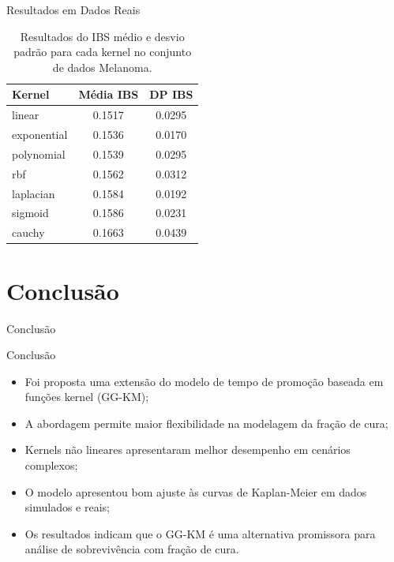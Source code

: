 \documentclass[aspectratio=169,t,xcolor=table]{beamer}
\begin{document}
\begin{frame}{Resultados em Dados Reais}
\begin{table}[ht]
\centering
\caption{Resultados do IBS médio e desvio padrão para cada kernel no conjunto de dados Melanoma.}
\label{tab:melanoma_kernels}
\begin{tabular}{lcc}
\toprule
Kernel & Média IBS & DP IBS \\
\midrule
linear      & 0.1517 & 0.0295 \\
exponential & 0.1536 & 0.0170 \\
polynomial  & 0.1539 & 0.0295 \\
rbf         & 0.1562 & 0.0312 \\
laplacian   & 0.1584 & 0.0192 \\
sigmoid     & 0.1586 & 0.0231 \\
cauchy      & 0.1663 & 0.0439 \\
\bottomrule
\end{tabular}
\end{table}
\end{frame}

\section{Conclusão}
\begin{frame}{Conclusão}
\end{frame}

\begin{frame}{Conclusão}
\begin{itemize}
\item Foi proposta uma extensão do modelo de tempo de promoção baseada em funções kernel (GG-KM);
\vspace{0.3cm}
\item A abordagem permite maior flexibilidade na modelagem da fração de cura;
\vspace{0.3cm}
\item Kernels não lineares apresentaram melhor desempenho em cenários complexos;
\vspace{0.3cm}
\item O modelo apresentou bom ajuste às curvas de Kaplan-Meier em dados simulados e reais;
\vspace{0.3cm}
\item Os resultados indicam que o GG-KM é uma alternativa promissora para análise de sobrevivência com fração de cura.
\end{itemize}
\end{frame}
\end{document}

